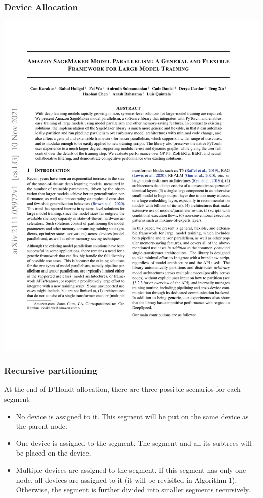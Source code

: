 \documentclass[12pt,aspectratio=169]{beamer}
\begin{document}
    \begin{frame}
        \frametitle{Device Allocation}

        \centering
        \includegraphics[page=15,trim=1.8cm 21cm 11.2cm 2.1cm,clip,scale=1.1]{paper.pdf}
    \end{frame}

    \begin{frame}
        \frametitle{Recursive partitioning}

        At the end of D'Hondt allocation, there are three possible scenarios for each segment:

        \begin{itemize}
            \item No device is assigned to it. This segment will be put on the same device as the parent node.
            \item One device is assigned to the segment. The segment and all its subtrees will be placed on the device.
            \item Multiple devices are assigned to the segment. If this segment has only one node, all devices are
            assigned to it (it will be revisited in Algorithm 1). Otherwise, the segment is further divided into smaller
            segments recursively.
        \end{itemize}
    \end{frame}
\end{document}
